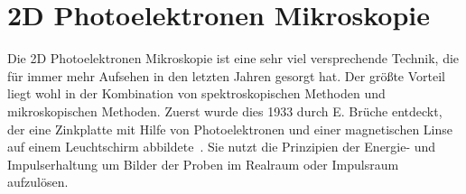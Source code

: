     \section{2D Photoelektronen Mikroskopie} \label{sec:2D-PES}
        Die 2D Photoelektronen Mikroskopie ist eine sehr viel versprechende Technik, die für immer mehr Aufsehen in den letzten Jahren gesorgt hat.
        Der größte Vorteil liegt wohl in der Kombination von spektroskopischen Methoden und mikroskopischen Methoden.
        Zuerst wurde dies 1933 durch E. Brüche entdeckt, der eine Zinkplatte mit Hilfe von Photoelektronen und einer magnetischen Linse auf einem Leuchtschirm abbildete~\cite{bruche_elektronenmikroskopische_1933}.
        Sie nutzt die Prinzipien der Energie- und Impulserhaltung um Bilder der Proben im Realraum oder Impulsraum aufzulösen.

